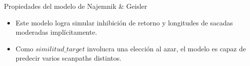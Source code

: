 \documentclass[compress]{beamer}
\DeclareMathOperator*{\avg}{avg}
\begin{document}










\begin{frame}{Propiedades del modelo de Najemnik \& Geisler}
\begin{itemize}
\item Este modelo logra simular inhibición de retorno y longitudes de sacadas moderadas implícitamente. 
\item Como $similitud\_target$ involucra una elección al azar, el modelo es capaz de predecir varios scanpaths distintos.
\end{itemize}
\end{frame}
\end{document}
